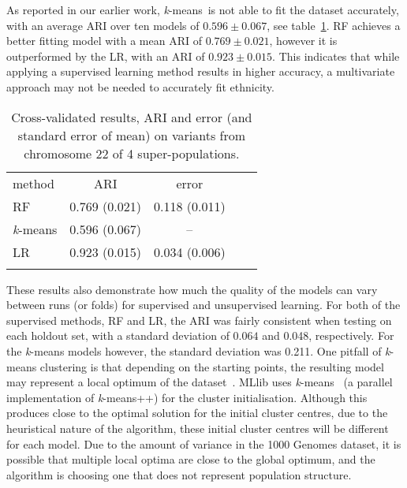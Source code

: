 \documentclass{llncs}
\newcommand{\kMeans}{\textit{k}-means}
\begin{document}
{
As reported in our earlier work, \kMeans\ is not able to fit the dataset accurately, with an average ARI over ten models of \(0.596 \pm 0.067\), see table~\ref{RF}.
RF achieves a better fitting model with a mean ARI of \(0.769 \pm 0.021\), however it is outperformed by the LR, with an ARI of \(0.923 \pm 0.015\).
This indicates that while applying a supervised learning method results in higher accuracy, a multivariate approach may not be needed to accurately fit ethnicity. 


\begin{table}
\caption{Cross-validated results, ARI and error (and standard error of mean) on variants from chromosome 22 of 4 super-populations.}
\begin{center}
\renewcommand{\arraystretch}{1.4}
\setlength\tabcolsep{3pt}
\begin{tabular}{lcccc}
\hline\noalign{\smallskip}
method  & ARI & error \\
RF  & 0.769 (0.021) &0.118 (0.011) \\
\kMeans & 0.596 (0.067) & -- \\
LR & 0.923 (0.015) & 0.034 (0.006) \\
\noalign{\smallskip}
\hline
\label{RF}
\end{tabular}
\end{center}
\end{table}

These results also demonstrate how much the quality of the models can vary between runs (or folds) for supervised and unsupervised learning.
For both of the supervised methods, RF and LR, the ARI was fairly consistent when testing on each holdout set, with a standard deviation of
\( 0.064 \) and 0.048, respectively. For the \kMeans{} models however, the standard deviation was 0.211.
One pitfall of \kMeans{} clustering is that depending on the starting points, the resulting model may represent a local optimum of the dataset~\cite{Steinley2003}.
{\sc MLlib} uses {\sc \kMeans\textbar\textbar}~\cite{Bahmani2012} (a parallel implementation of \kMeans{}++) for the cluster initialisation.
Although this produces close to the optimal solution for the initial cluster centres, due to the heuristical nature of the algorithm,
these initial cluster centres will be different for each model. Due to the amount of variance in the 1000 Genomes dataset, it is possible that multiple local
optima are close to the global optimum, and the algorithm is choosing one that does not represent population structure.

}
\end{document}
